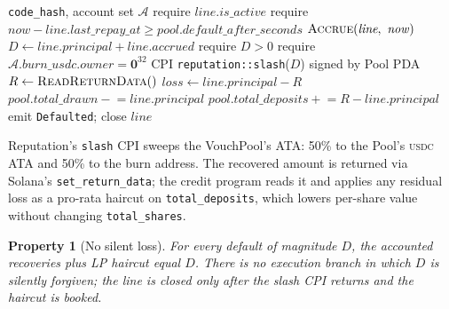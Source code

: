 \documentclass[10pt,conference,letterpaper]{IEEEtran}
\newtheorem{property}[theorem]{Property}
\theoremstyle{definition}
\newcommand{\codehash}{\texttt{code\_hash}}
\newcommand{\USDC}{\textsc{usdc}}
\begin{document}
\begin{algorithm}[t]
\caption{\texttt{mark\_default}: slash and LP haircut.}
\label{alg:default}
\begin{algorithmic}[1]
\Require \codehash, account set $\mathcal{A}$
\State require $\textit{line}.\mathit{is\_active}$
\State require $\mathit{now} - \textit{line}.\mathit{last\_repay\_at} \ge \mathit{pool}.\mathit{default\_after\_seconds}$
\State $\textsc{Accrue}(\textit{line},\ \mathit{now})$
\State $D \gets \textit{line}.\mathit{principal} + \textit{line}.\mathit{accrued}$
\State require $D > 0$
\State require $\mathcal{A}.\mathit{burn\_usdc}.\mathit{owner} = \mathbf{0}^{32}$
\State CPI \texttt{reputation::slash}($D$) signed by Pool PDA
\State $R \gets \textsc{ReadReturnData}()$ 
\State $\mathit{loss} \gets \textit{line}.\mathit{principal} - R$
\State $\mathit{pool}.\mathit{total\_drawn} \mathrel{-}= \textit{line}.\mathit{principal}$
\State $\mathit{pool}.\mathit{total\_deposits} \mathrel{+}= R - \textit{line}.\mathit{principal}$
\State emit \texttt{Defaulted}; close $\textit{line}$
\end{algorithmic}
\end{algorithm}

Reputation's \texttt{slash} CPI sweeps the VouchPool's ATA: 50\% to the
Pool's \USDC{} ATA and 50\% to the burn address. The recovered amount
is returned via Solana's \texttt{set\_return\_data}; the credit program
reads it and applies any residual loss as a pro-rata haircut on
\texttt{total\_deposits}, which lowers per-share value without changing
\texttt{total\_shares}.

\begin{property}[No silent loss]\label{prop:no-silent}
For every default of magnitude $D$, the accounted recoveries plus LP
haircut equal $D$. There is no execution branch in which $D$ is
silently forgiven; the line is closed only after the slash CPI returns
and the haircut is booked.
\end{property}
\end{document}
